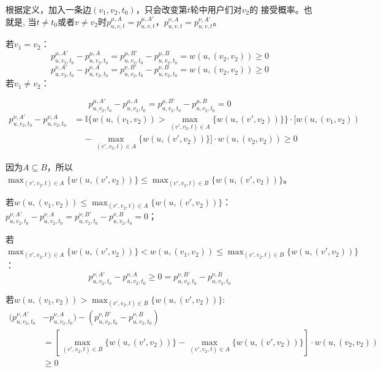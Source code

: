 根据定义，加入一条边$(v_1,v_2,t_0)$，只会改变第$t$轮中用户们对$v_2$的 接受概率。也就是, 当$t\ne t_0$或者$v \ne v_2$时$p_{u,v,t}^{\mu,A}=p_{u,v,t}^{\mu,A'}$，$p_{u,v,t}^{\nu,A}=p_{u,v,t}^{\nu,A'}$。

若$v_1=v_2$：
\begin{equation}
p_{u,v_2,t_0}^{\mu,A'}-p_{u,v_2,t_0}^{\mu,A}=p_{u,v_2,t_0}^{\mu,B'}-p_{u,v_2,t_0}^{\mu,B} =w(u,(v_2,v_2)) \ge 0
\end{equation}
\begin{equation}
p_{u,v_2,t_0}^{\nu,A'}-p_{u,v_2,t_0}^{\nu,A}=p_{u,v_2,t_0}^{\nu,B'}-p_{u,v_2,t_0}^{\nu,B} =w(u,(v_2,v_2)) \ge 0
\end{equation}
若$v_1 \ne v_2$：

\begin{equation}
    p_{u,v_2,t_0}^{\mu,A'}-p_{u,v_2,t_0}^{\mu,A}=p_{u,v_2,t_0}^{\mu,B'}-p_{u,v_2,t_0}^{\mu,B} = 0 
\end{equation}
\begin{align}
    p_{u,v_2,t_0}^{\nu,A'}-p_{u,v_2,t_0}^{\nu,A}&=\mathbb{I}\{w(u,(v_1,v_2))>\max_{(v',v_2,t)\in A}\{w(u,(v',v_2))\}\} \cdot [w(u,(v_1,v_2))\\ 
    & \ \ \ \ \ -\max_{(v',v_2,t)\in A}\{w(u,(v',v_2))\}] \cdot w(u,(v_2,v_2)) \ge  0
\end{align}

因为$A \subseteq B$，所以$\max_{(v',v_2,t)\in A}\{w(u,(v',v_2))\} \le \max_{(v',v_2,t)\in B}\{w(u,(v',v_2))\}$。

若$w(u,(v_1,v_2))\le \max_{(v',v_2,t)\in A}\{w(u,(v',v_2))\}$：$p_{u,v_2,t_0}^{\nu,A'}-p_{u,v_2,t_0}^{\nu,A}=p_{u,v_2,t_0}^{\nu,B'}-p_{u,v_2,t_0}^{\nu,B}=0$；

若$\max_{(v',v_2,t)\in A}\{w(u,(v',v_2))\} < w(u,(v_1,v_2)) \le \max_{(v',v_2,t)\in B}\{w(u,(v',v_2))\}$：
\begin{equation}
p_{u,v_2,t_0}^{\nu,A'}-p_{u,v_2,t_0}^{\nu,A}\ge 0 = p_{u,v_2,t_0}^{\nu,B'}-p_{u,v_2,t_0}^{\nu,B}
\end{equation}

若$w(u,(v_1,v_2)) > \max_{(v',v_2,t)\in B}\{w(u,(v',v_2))\}$:
\begin{align}
    (p_{u,v_2,t_0}^{\nu,A'}&-p_{u,v_2,t_0}^{\nu,A})-(p_{u,v_2,t_0}^{\nu,B'}-p_{u,v_2,t_0}^{\nu,B}) \\ 
    &=[\max_{(v',v_2,t)\in B}\{w(u,(v',v_2))\} - \max_{(v',v_2,t)\in A}\{w(u,(v',v_2))\}] \cdot w(u,(v_2,v_2)) \\
    &\ge 0
\end{align}


